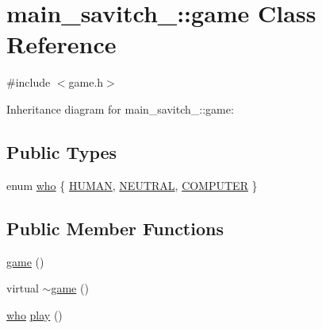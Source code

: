 \hypertarget{classmain__savitch__14_1_1game}{}\section{main\+\_\+savitch\+\_\+:\+:game Class Reference}
\label{classmain__savitch__14_1_1game}


{\ttfamily \#include $<$game.\+h$>$}



Inheritance diagram for main\+\_\+savitch\+\_\+:\+:game\+:
\subsection*{Public Types}
\begin{DoxyCompactItemize}
\item 
enum \hyperlink{classmain__savitch__14_1_1game_a4fe20fb287f809ae2b68e28e4ccba634}{who} \{ \hyperlink{classmain__savitch__14_1_1game_a4fe20fb287f809ae2b68e28e4ccba634ad1ab8515b7d878438d60ec785343b305}{H\+U\+M\+AN}, 
\hyperlink{classmain__savitch__14_1_1game_a4fe20fb287f809ae2b68e28e4ccba634af05e1639d5a0101703a1e178cf5ba666}{N\+E\+U\+T\+R\+AL}, 
\hyperlink{classmain__savitch__14_1_1game_a4fe20fb287f809ae2b68e28e4ccba634a983c07bd1a5606dd31a0fd6a6b86b36b}{C\+O\+M\+P\+U\+T\+ER}
 \}
\end{DoxyCompactItemize}
\subsection*{Public Member Functions}
\begin{DoxyCompactItemize}
\item 
\hyperlink{classmain__savitch__14_1_1game_a65afffa6f5aa8dcd781ad38f898130e0}{game} ()
\item 
virtual \hyperlink{classmain__savitch__14_1_1game_a5e8d21d1d658a12db6fddacca3490671}{$\sim$game} ()
\item 
\hyperlink{classmain__savitch__14_1_1game_a4fe20fb287f809ae2b68e28e4ccba634}{who} \hyperlink{classmain__savitch__14_1_1game_a4dbeaddb78059f7c5dcbf5cc4e026317}{play} ()
\end{DoxyCompactItemize}
